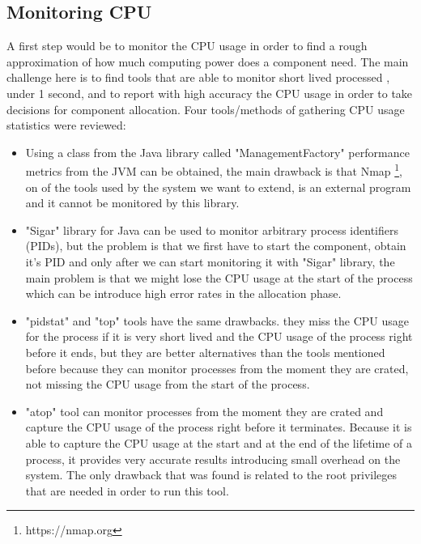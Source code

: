 \subsection{Monitoring CPU}
A first step would be to monitor the CPU usage in order to find a rough approximation of how much computing power does a component need. The main challenge here is to find tools that are able to monitor short lived processed , under 1 second, and to report with high accuracy the CPU usage in order to take decisions for component allocation. Four tools/methods of gathering CPU usage statistics were reviewed:  
\begin{itemize}
	\item Using a class from the Java library called "ManagementFactory" performance metrics from the JVM can be obtained, the main drawback is that Nmap \footnote{https://nmap.org}, on of the tools used by the system we want to extend, is an external program and it cannot be monitored by this library.
	\item "Sigar" library for Java can be used to monitor arbitrary process identifiers (PIDs), but the problem is that we first have to start the component, obtain it's PID and only after we can start monitoring it with "Sigar" library, the main problem is that we might lose the CPU usage at the start of the process which can be introduce high error rates in the allocation phase.
	\item "pidstat" and "top" tools have the same drawbacks. they miss the CPU usage for the process if it is very short lived and the CPU usage of the process right before it ends, but they are better alternatives than the tools mentioned before because they can monitor processes from the moment they are crated, not missing the CPU usage from the start of the process.
	\item "atop" tool can monitor processes from the moment they are crated and capture the CPU usage of the process right before it terminates. Because it is able to capture the CPU usage at the start and at the end of the lifetime of a process, it provides very accurate results introducing small overhead on the system. The only drawback that was found is related to the root privileges that are needed in order to run this tool.
\end{itemize}
 
